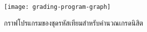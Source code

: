 {\begin{figure}[ht!]
    \centering
    \texttt{[image: grading-program-graph]}



    \caption{กราฟโปรแกรมของชุดรหัสเทียมสำหรับคำนวณเกรดนิสิต}
    \label{fig:programGraph}
\end{figure}

}
